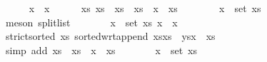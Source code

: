 \begin{isabellebody}
\endisadelimproof
%
\isatagproof
{}\isamarkupfalse%
\isanewline
\ \ \ \ \isamarkupfalse%
\ {\isachardoublequoteopen}x\ {\isacharless}{\kern0pt}\ x\isanewline
\ \ \ \ \isamarkupfalse%
\ xs\ xs\ \ {\isachardoublequoteopen}xs\ {\isacharequal}{\kern0pt}\ xs\ {\isacharat}{\kern0pt}\ x\ {\isacharhash}{\kern0pt}\ xs\isanewline
\ \ \ \ \ \ \isamarkupfalse%
\ {\isacartoucheopen}x\ {\isasymin}\ set\ xs{\isacartoucheclose}\isanewline
\ \ \ \ \ \ \isamarkupfalse%
\ {\isacharparenleft}{\kern0pt}meson\ split{\isacharunderscore}{\kern0pt}list{\isacharparenright}{\kern0pt}\isanewline
\ \ \ \ \isamarkupfalse%
\ \isamarkupfalse%
\ {\isachardoublequoteopen}{\isasymforall}x\ {\isasymin}\ set\ xs\ x\ {\isacharless}{\kern0pt}\ x{\isachardoublequoteclose}\isanewline
\ \ \ \ \ \ \isamarkupfalse%
\ {\isacartoucheopen}strict{\isacharunderscore}{\kern0pt}sorted\ xs{\isacartoucheclose}\ sorted{\isacharunderscore}{\kern0pt}wrt{\isacharunderscore}{\kern0pt}append{\isacharbrackleft}{\kern0pt}\ xs{\isacharequal}{\kern0pt}{\isachardoublequoteopen}xs\ \ ys{\isacharequal}{\kern0pt}{\isachardoublequoteopen}x\ {\isacharhash}{\kern0pt}\ xs\isanewline
\ \ \ \ \ \ \isamarkupfalse%
\ {\isacharparenleft}{\kern0pt}simp\ add{\isacharcolon}{\kern0pt}\ {\isacartoucheopen}xs\ {\isacharequal}{\kern0pt}\ xs\ {\isacharat}{\kern0pt}\ x\ {\isacharhash}{\kern0pt}\ xs\isanewline
\ \ \ \ \isamarkupfalse%
\ \isamarkupfalse%
\ {\isachardoublequoteopen}x\ {\isasymin}\ set\ xs\isanewline
\ \ \ \ \ \ \isamarkupfalse%

\end{isabellebody}
